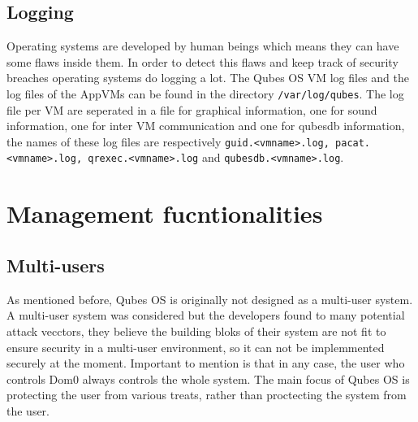 \documentclass[runningheads,a4paper]{article}
\begin{document}
\subsection{Logging}
Operating systems are developed by human beings which means they can
have some flaws inside them. In order to detect this flaws and keep
track of security breaches operating systems do logging a lot. The
Qubes OS VM log files and the log files of the AppVMs can be found in
the directory \texttt{/var/log/qubes}. The log file per VM are
seperated in a file for graphical information, one for sound
information, one for inter VM communication and one for qubesdb
information, the names of these log files are respectively
\texttt{guid.<vmname>.log, pacat.<vmname>.log, qrexec.<vmname>.log}
and \texttt{qubesdb.<vmname>.log}.

\section{Management fucntionalities}
\subsection{Multi-users}
As mentioned before, Qubes OS is originally not designed as a
multi-user system.  A multi-user system was considered but the
developers found to many potential attack vecctors, they believe the
building bloks of their system are not fit to ensure security in a
multi-user environment, so it can not be implemmented securely at the
moment. Important to mention is that in any case, the user who
controls Dom0 always controls the whole system. The main focus of
Qubes OS is protecting the user from various treats, rather than
proctecting the system from the user.
\end{document}

